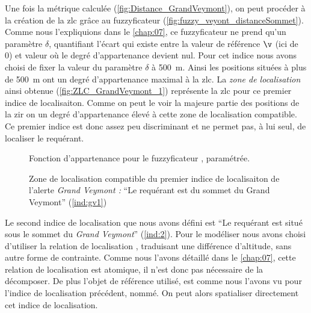 Une fois la métrique calculée (\autoref{fig:Distance_GrandVeymont}),
on peut procéder à la création de la \ac{zlc} grâce au fuzzyficateur
(\autoref{fig:fuzzy_veyont_distanceSommet}). Comme nous l'expliquions
dans le \autoref{chap:07}, ce fuzzyficateur ne prend qu'un paramètre
\(\delta\), quantifiant l'écart qui existe entre la valeur de
référence \(\v\) (ici de 0) et valeur où le degré d'appartenance
devient nul. Pour cet indice nous avons choisi de fixer la valeur du
paramètre \(\delta\) à \SI{500}{\meter}. Ainsi les positions situées à
plus de \SI{500}{\meter} ont un degré d'appartenance maximal à la
\ac{zlc}. La \emph{zone de localisation} ainsi obtenue
(\autoref{fig:ZLC_GrandVeymont_1}) représente la \ac{zlc} pour ce
premier indice de localisaiton. Comme on peut le voir la majeure
partie des positions de la \ac{zir} on un degré d'appartenance élevé à
cette zone de localisation compatible. Ce premier indice est donc
assez peu discriminant et ne permet pas, à lui seul, de localiser le
requérant.

\begin{figure}
  \centering
  
  \caption{Fonction d'appartenance pour le fuzzyficateur
    \protect{}, paramétrée.}
  \label{fig:fuzzy_veyont_distanceSommet}
\end{figure}

\begin{figure}
  \centering
  
  \caption{Zone de localisation compatible du premier indice de
    localisaiton de l'alerte \emph{Grand Veymont :} \enquote{Le
      requérant est \protect{}
      du sommet du Grand Veymont} (\ref{ind:gv1})}
  \label{fig:ZLC_GrandVeymont_1}
\end{figure}

Le second indice de localisation que nous avons défini est \enquote{Le
  requérant est situé sous le sommet du \emph{Grand Veymont}}
(\ref{ind:2}). Pour le modéliser nous avons choisi d'utiliser la
relation de localisation , traduisant une
différence d'altitude, sans autre forme de contrainte. Comme nous
l'avons détaillé dans le \autoref{chap:07}, cette relation de
localisation est atomique, il n'est donc pas nécessaire de la
décomposer. De plus l'objet de référence utilisé, est comme nous
l'avons vu pour l'indice de localisation précédent, nommé. On peut
alors spatialiser directement cet indice de localisation.

